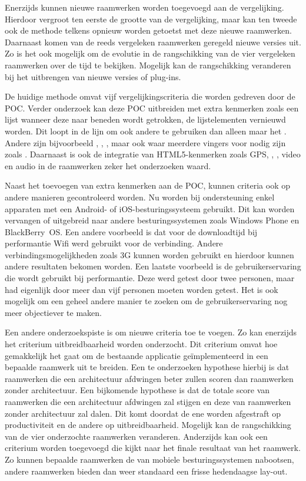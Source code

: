 Enerzijds kunnen nieuwe raamwerken worden toegevoegd aan de vergelijking.
Hierdoor vergroot ten eerste de grootte van de vergelijking, maar kan ten tweede ook de methode telkens opnieuw worden getoetst met deze nieuwe raamwerken.
Daarnaast komen van de reeds vergeleken raamwerken geregeld nieuwe versies uit.
Zo is het ook mogelijk om de evolutie in de rangschikking van de vier vergeleken raamwerken over de tijd te bekijken.
Mogelijk kan de rangschikking veranderen bij het uitbrengen van nieuwe versies of plug-ins.

De huidige methode omvat vijf vergelijkingscriteria die worden gedreven door de POC.
Verder onderzoek kan deze POC uitbreiden met extra kenmerken zoals een lijst wanneer deze naar beneden wordt getrokken, de lijstelementen vernieuwd worden.
Dit loopt in de lijn om ook andere  te gebruiken dan alleen maar het  .
Andere  zijn bijvoorbeeld , , , maar ook  waar meerdere vingers voor nodig zijn zoals .
Daarnaast is ook de integratie van HTML5-kenmerken zoals GPS, , , video en audio in de raamwerken zeker het onderzoeken waard.

Naast het toevoegen van extra kenmerken aan de POC, kunnen criteria ook op andere manieren gecontroleerd worden.
Nu worden bij ondersteuning enkel apparaten met een Android- of iOS-besturingssysteem gebruikt.
Dit kan worden vervangen of uitgebreid naar andere besturingssystemen zoals Windows Phone en BlackBerry~OS.
Een andere voorbeeld is dat voor de downloadtijd bij performantie Wifi werd gebruikt voor de verbinding.
Andere verbindingsmogelijkheden zoals 3G kunnen worden gebruikt en hierdoor kunnen andere resultaten bekomen worden.
Een laatste voorbeeld is de gebruikerservaring die wordt gebruikt bij performantie.
Deze werd getest door twee personen, maar had eigenlijk door meer dan vijf personen moeten worden getest.
Het is ook mogelijk om een geheel andere manier te zoeken om de gebruikerservaring nog meer objectiever te maken.

Een andere onderzoekspiste is om nieuwe criteria toe te voegen.
Zo kan enerzijds het criterium uitbreidbaarheid worden onderzocht.
Dit criterium omvat hoe gemakkelijk het gaat om de bestaande applicatie geïmplementeerd in een bepaalde raamwerk uit te breiden.
Een te onderzoeken hypothese hierbij is dat raamwerken die een architectuur afdwingen beter zullen scoren dan raamwerken zonder architectuur.
Een bijkomende hypothese is dat de totale score van raamwerken die een architectuur afdwingen zal stijgen en deze van raamwerken zonder architectuur zal dalen.
Dit komt doordat de ene worden afgestraft op productiviteit en de andere op uitbreidbaarheid.
Mogelijk kan de rangschikking van de vier onderzochte raamwerken veranderen.
Anderzijds kan ook een criterium worden toegevoegd die kijkt naar het finale resultaat van het raamwerk.
Zo kunnen bepaalde raamwerken de  van mobiele besturingssystemen  nabootsen, andere raamwerken bieden dan weer standaard een frisse hedendaagse lay-out.

